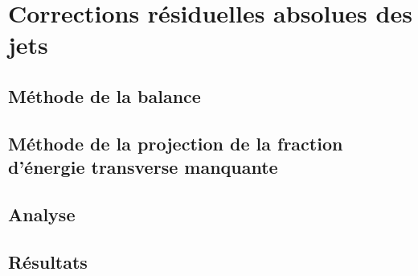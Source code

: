 \section{Corrections résiduelles absolues des jets}\label{chapter-JERC-section-JES}

\subsection{Méthode de la balance}\label{chapter-JERC-section-JES-subsec-balance}

\subsection{Méthode de la projection de la fraction d'énergie transverse manquante}\label{chapter-JERC-section-JES-subsec-MPF}

\subsection{Analyse}\label{chapter-JERC-section-JES-subsec-analyse}

\subsection{Résultats}\label{chapter-JERC-section-JES-subsec-results}

